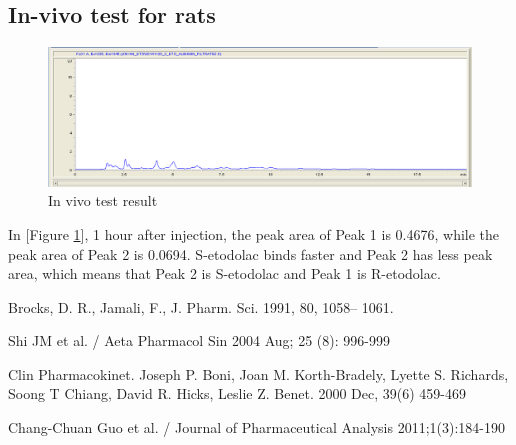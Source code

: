 \documentclass[12pt]{article} %
\begin{document}
\subsection {In-vivo test for rats}

\begin{figure}[h!]
  \centering
  \includegraphics[width=\linewidth]{fig8.png}
  \caption{In vivo test result}
  \label{fig:fig8}
\end{figure}

 In [Figure \ref{fig:fig8}],  1 hour after injection, the peak area of Peak 1 is 0.4676, while the peak area of Peak 2 is 0.0694. S-etodolac binds faster\cite{cite2} and Peak 2 has less peak area, which means that Peak 2 is S-etodolac and Peak 1 is R-etodolac.



\newpage

\begin{thebibliography}{100}
	Brocks, D. R., Jamali, F., J. Pharm. Sci. 1991, 80, 1058– 1061.


        Shi JM et al. / Aeta Pharmacol Sin 2004 Aug; 25 (8): 996-999

        Clin Pharmacokinet. Joseph P. Boni, Joan M. Korth-Bradely, Lyette S. Richards, Soong T Chiang, David R. Hicks, Leslie Z. Benet. 2000 Dec, 39(6) 459-469

	Chang-Chuan Guo et al. / Journal of Pharmaceutical Analysis  2011;1(3):184-190

\end{thebibliography}
\end{document}
